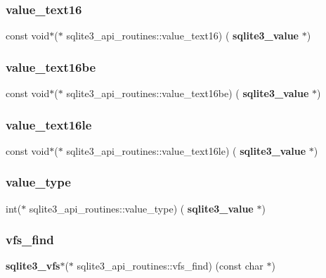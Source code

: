 \subsubsection{value\_text16}
{\footnotesize\ttfamily const void$\ast$($\ast$ sqlite3\+\_\+api\+\_\+routines\+::value\+\_\+text16) (\textbf{ sqlite3\+\_\+value} $\ast$)}

\mbox{\label{structsqlite3__api__routines_af21386f3f28a2deefa8fe73d07c6f7ca}} 
\subsubsection{value\_text16be}
{\footnotesize\ttfamily const void$\ast$($\ast$ sqlite3\+\_\+api\+\_\+routines\+::value\+\_\+text16be) (\textbf{ sqlite3\+\_\+value} $\ast$)}

\mbox{\label{structsqlite3__api__routines_a1a99f053ce6183ec8fcb007e7b66a43c}} 
\subsubsection{value\_text16le}
{\footnotesize\ttfamily const void$\ast$($\ast$ sqlite3\+\_\+api\+\_\+routines\+::value\+\_\+text16le) (\textbf{ sqlite3\+\_\+value} $\ast$)}

\mbox{\label{structsqlite3__api__routines_a30e5d5464fae02a66e73c0ee6afa3a0d}} 
\subsubsection{value\_type}
{\footnotesize\ttfamily int($\ast$ sqlite3\+\_\+api\+\_\+routines\+::value\+\_\+type) (\textbf{ sqlite3\+\_\+value} $\ast$)}

\mbox{\label{structsqlite3__api__routines_a86ef5c166aac6ae6fe3ccbdaca51509b}} 
\subsubsection{vfs\_find}
{\footnotesize\ttfamily \textbf{ sqlite3\+\_\+vfs}$\ast$($\ast$ sqlite3\+\_\+api\+\_\+routines\+::vfs\+\_\+find) (const char $\ast$)}

